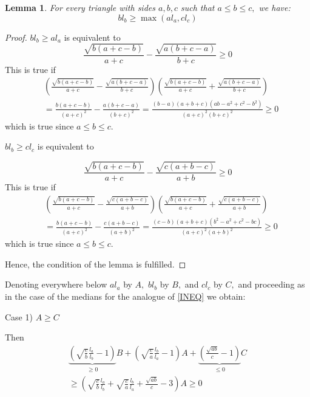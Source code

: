 \documentclass[a4paper,12pt]{article}
\newtheorem{lemma}{Lemma}
\begin{document}
\begin{lemma} For every triangle with sides $a,b,c$ such that $a \leq b \leq c,$ we have:
\[
bl_b \geq \max(al_a,cl_c)
\]
\end{lemma}
\begin{proof}
$ bl_b \geq al_a$ is equivalent to
\begin{equation}
\frac{\sqrt{b (a+c-b)} }{a+c}-         \frac{\sqrt{a (b+c-a)} }{b+c}  \geq 0                         
\end{equation}
This is true if
\begin{align*}
&\left(\frac{\sqrt{b (a+c-b)} }{a+c}-         \frac{\sqrt{a (b+c-a)} }{b+c}  \right)\left(\frac{\sqrt{b (a+c-b)} }{a+c}+        \frac{\sqrt{a (b+c-a)} }{b+c}  \right) \\
&=\frac{{b (a+c-b)} }{(a+c)^2}-    \frac{{a (b+c-a)} }{(b+c)^2}  =\frac{(b - a) (a + b + c) ( a b -a^2+c^2- b^2 )}{(a+c)^2(b+c)^2} \geq 0                      
\end{align*}
which is true since $a \leq b \leq c.$


$ bl_b \geq cl_c$ is equivalent to

\begin{equation}
\frac{\sqrt{b (a+c-b)} }{a+c}-         \frac{\sqrt{c (a+b-c)} }{a+b}  \geq 0                         
\end{equation}
This is true if
\begin{align*}
&\left(\frac{\sqrt{b (a+c-b)} }{a+c}-         \frac{\sqrt{c (a+b-c)} }{a+b}  \right)\left(\frac{\sqrt{b (a+c-b)} }{a+c}+        \frac{\sqrt{c (a+b-c)} }{a+b}   \right) \\
&=\frac{{b (a+c-b)} }{(a+c)^2}-    \frac{{c (a+b-c)} }{(a+b)^2}  =\frac{(c - b) (a + b + c) ( b^2 -a^2 +c^2- b c )}{(a+c)^2(a+b)^2} \geq 0                      
\end{align*}
which is true since $a \leq b \leq c.$

Hence, the condition of the lemma is fulfilled.
\end{proof}

Denoting everywhere below $al_a$ by $A,$ $bl_b$ by $B,$ and $cl_c$ by $C,$  and proceeding as in the case of the medians for the analogue of \eqref{INEQ} we obtain:

Case 1) $A \geq C$

Then 
\begin{align*}
\underbrace{\left(\sqrt{\frac{c}{b}}\frac{l_a}{l_b}-1\right)}_{\geq 0} B+\left(\sqrt{\frac{c}{a}}\frac{l_b}{l_a}-1\right)A+\underbrace{\left(\frac{\sqrt{ab}}{c}-1\right)}_{\leq 0}C\\
\geq \left(\sqrt{\frac{c}{b}}\frac{l_a}{l_b}+\sqrt{\frac{c}{a}}\frac{l_b}{l_a}+\frac{\sqrt{ab}}{c}-3\right)A \geq 0
\end{align*}
\end{document}
